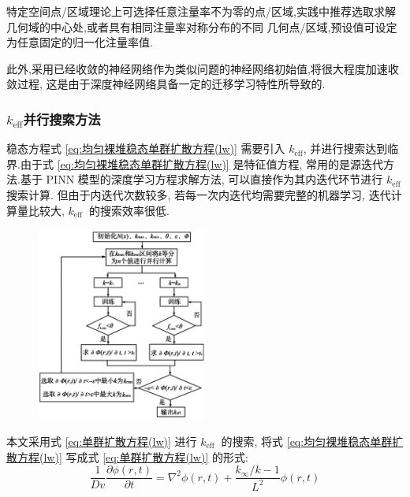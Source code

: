 \documentclass{Sichuan Normal University}
\begin{document}
特定空间点/区域理论上可选择任意注量率不为零的点/区域,实践中推荐选取求解几何域的中心处,或者具有相同注量率对称分布的不同 几何点/区域,预设值可设定为任意固定的归一化注量率值. 

此外,采用已经收敛的神经网络作为类似问题的神经网络初始值,将很大程度加速收敛过程, 这是由于深度神经网络具备一定的迁移学习特性所导致的.

\subsubsection{$k_{\text{eff}}$并行搜索方法}\label{sec:并行搜索方法}
稳态方程式 \eqref{eq:均匀裸堆稳态单群扩散方程(lw)} 需要引入 $k_{\mathrm{eff}}$, 并进行搜索达到临界.由于式 \eqref{eq:均匀裸堆稳态单群扩散方程(lw)} 是特征值方程, 常用的是源迭代方法.基于 PINN 模型的深度学习方程求解方法, 可以直接作为其内迭代环节进行 $k_{\mathrm{eff}}$ 搜索计算.
但由于内迭代次数较多, 若每一次内迭代均需要完整的机器学习, 迭代计算量比较大, $k_{\text {eff }}$ 的搜索效率很低.
\begin{figure}[H]
    \centering
    \includegraphics[width=0.5\textwidth]{./figure/k_eff并行搜索流程图.png} %
    \label{fig:k_eff并行搜索流程图}
\end{figure}

本文采用式 \eqref{eq:单群扩散方程(lw)} 进行 $k_{\text {eff }}$ 的搜索, 将式 \eqref{eq:均匀裸堆稳态单群扩散方程(lw)} 写成式 \eqref{eq:单群扩散方程(lw)} 的形式:
\begin{equation}
    \frac{1}{D v} \frac{\partial \phi(r, t)}{\partial t}=\nabla^2 \phi(r, t)+\frac{k_{\infty} / k-1}{L^2} \phi(r, t)
\label{eq:单群扩散方程(lw)2}
\end{equation}
\end{document}
